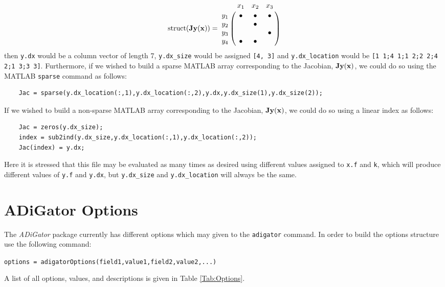 \documentclass[10pt,pdftex]{article}
\let\bbordermatrix\bordermatrix
\begin{document}
\begin{equation}
\text{struct}(\bfJ\bfy(\bfx)) = \bbordermatrix{~ & x_1 & x_2 & x_3 \cr
y_1 & \bullet & \bullet & \bullet \cr
y_2 & ~ & \bullet & ~ \cr
y_3 & ~ & ~ & \bullet \cr
y_4 & \bullet & \bullet & ~}
\end{equation}
then \texttt{y.dx} would be a column vector of length 7, \texttt{y.dx\_size} would be assigned \texttt{[4, 3]} and \texttt{y.dx\_location} would be \texttt{[1 1;4 1;1 2;2 2;4 2;1 3;3 3]}. Furthermore, if we wished to build a sparse MATLAB array corresponding to the Jacobian, $\mathbf{J}\mathbf{y}(\mathbf{x})$,  we could do so using the MATLAB \texttt{sparse} command as follows:
\begin{verbatim}
    Jac = sparse(y.dx_location(:,1),y.dx_location(:,2),y.dx,y.dx_size(1),y.dx_size(2));
\end{verbatim}
If we wished to build a non-sparse MATLAB array corresponding to the Jacobian,  $\mathbf{J}\mathbf{y}(\mathbf{x})$, we could do so using  a linear index as follows:
\begin{verbatim}
    Jac = zeros(y.dx_size);
    index = sub2ind(y.dx_size,y.dx_location(:,1),y.dx_location(:,2));
    Jac(index) = y.dx;
\end{verbatim}
Here it is stressed that this file may be evaluated as many times as desired using different values assigned to \texttt{x.f} and \texttt{k}, which will produce different values of \texttt{y.f} and \texttt{y.dx}, but \texttt{y.dx\_size} and \texttt{y.dx\_location} will always be the same.
\section{ADiGator Options}\label{Sec:Options}
The \emph{ADiGator} package currently has different options which may given to the \texttt{adigator} command. In order to build the options structure use the following command:\\
\centerline{\texttt{options = adigatorOptions(field1,value1,field2,value2,...)}}
A list of all options, values, and descriptions is given in Table \ref{Tab:Options}.
\end{document}
